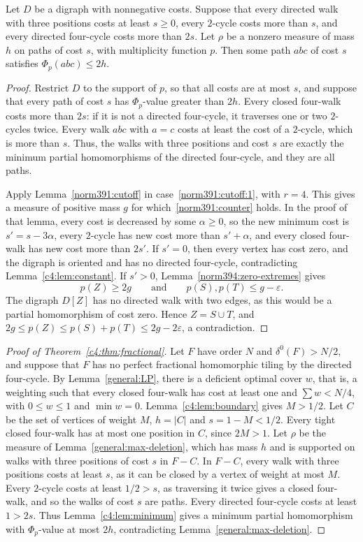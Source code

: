 \begin{lemma}\label{c4:lem:minimum}
Let $D$ be a digraph with nonnegative costs. Suppose that every directed walk with three positions costs at least $s\ge0$, every $2$-cycle costs
more than $s$, and every directed four-cycle costs more than
$2s$. Let $\rho$ be a nonzero measure of mass $h$ on paths of cost $s$, with multiplicity function
$p$. Then some path $abc$ of cost $s$ satisfies $\Phi_p(abc)\le2h$.
\end{lemma}
\begin{proof}
Restrict $D$ to the support of $p$, so that all costs are at most $s$, and suppose that every path of cost $s$ has $\Phi_p$-value greater than $2h$.
Every closed four-walk costs more than $2s$: if it is not a directed four-cycle, it traverses one or two $2$-cycles twice. Every walk $abc$ with $a=c$ costs at least the cost of a $2$-cycle, which is more than $s$. Thus, the walks with three positions and cost $s$ are exactly the minimum partial homomorphisms of the directed four-cycle, and they are all paths.

Apply Lemma~\ref{norm391:cutoff} in case~\ref{norm391:cutoff:1}, with $r=4$. This gives a measure of positive mass $g$ for which~\eqref{norm391:counter} holds. In the proof of that lemma, every cost is decreased by some $\alpha\ge0$, so the new minimum cost is $s'=s-3\alpha$, every $2$-cycle has new cost more than $s'+\alpha$, and every closed four-walk has new cost more than $2s'$.
If $s'=0$, then every vertex has cost zero, and the digraph is oriented and has no directed four-cycle, contradicting Lemma~\ref{c4:lem:constant}.
If $s'>0$, Lemma~\ref{norm394:zero-extremes} gives
\[
 p(Z)\ge2g\qquad\text{and}\qquad p(S),p(T)\le g-\varepsilon.
\]
The digraph $D[Z]$ has no directed walk with two edges, as this would be a partial homomorphism of cost zero. Hence $Z=S\cup T$, and
$2g\le p(Z)\le p(S)+p(T)\le2g-2\varepsilon$, a contradiction.
\end{proof}

\begin{proof}[Proof of Theorem~\ref{c4:thm:fractional}]
Let $F$ have order $N$ and $\delta^0(F)>N/2$, and suppose that $F$ has no perfect fractional homomorphic tiling by the directed four-cycle. By Lemma~\ref{general:LP}, there is a deficient optimal cover $w$, that is, a weighting such that every closed four-walk has cost at least one and $\sum w<N/4$, with $0\le w\le1$ and $\min w=0$.
Lemma~\ref{c4:lem:boundary} gives $M>1/2$. Let
$C$ be the set of vertices of weight $M$, $h=|C|$ and $s=1-M<1/2$.
Every tight closed four-walk has at most one position in $C$, since $2M>1$.
Let $\rho$ be the measure of Lemma~\ref{general:max-deletion}, which has mass $h$ and is supported on walks with three positions of cost $s$ in $F-C$.
In $F-C$, every walk with three positions costs
at least $s$, as it can be closed by a vertex of weight at most $M$.
Every $2$-cycle costs at least $1/2>s$, as traversing it twice gives a closed four-walk, and so the walks of cost $s$ are paths. Every directed four-cycle costs at least $1>2s$.
Thus Lemma~\ref{c4:lem:minimum} gives a minimum partial homomorphism with $\Phi_p$-value at most $2h$, contradicting
Lemma~\ref{general:max-deletion}.
\end{proof}

